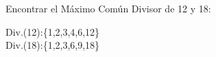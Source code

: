 
\question Encontrar el Máximo Común Divisor de 12 y 18:
  \begin{solutionorlines}[2cm]
    Div.(12):\{1,2,3,4,6,12\} \\
    Div.(18):\{1,2,3,6,9,18\}
  \end{solutionorlines}

